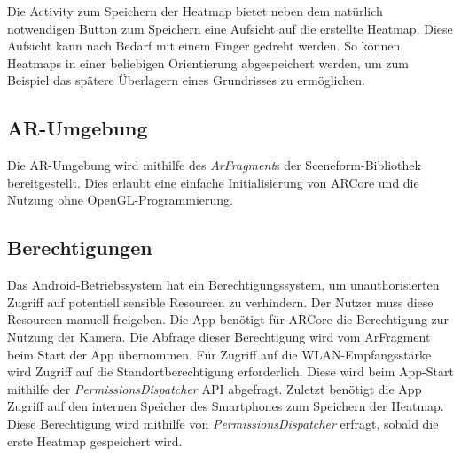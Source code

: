 \documentclass[10pt]{scrartcl}
\begin{document}
Die Activity zum Speichern der Heatmap bietet neben dem natürlich notwendigen Button zum Speichern eine Aufsicht auf die erstellte Heatmap. Diese Aufsicht kann nach Bedarf mit einem Finger gedreht werden. So können Heatmaps in einer beliebigen Orientierung abgespeichert werden, um zum Beispiel das spätere Überlagern eines Grundrisses zu ermöglichen.

\subsection{AR-Umgebung}
Die AR-Umgebung wird mithilfe des \textit{ArFragment}s der Sceneform-Bibliothek bereitgestellt. Dies erlaubt eine einfache Initialisierung von ARCore und die Nutzung ohne OpenGL-Programmierung.

\subsection{Berechtigungen}
Das Android-Betriebssystem hat ein Berechtigungssystem, um unauthorisierten Zugriff auf potentiell sensible Resourcen zu verhindern. Der Nutzer muss diese Resourcen manuell freigeben. Die App benötigt für ARCore die Berechtigung zur Nutzung der Kamera. Die Abfrage dieser Berechtigung wird vom ArFragment beim Start der App übernommen. Für Zugriff auf die WLAN-Empfangsstärke wird Zugriff auf die Standortberechtigung erforderlich. Diese wird beim App-Start mithilfe der \textit{PermissionsDispatcher} API \cite{pdisp} abgefragt. Zuletzt benötigt die App Zugriff auf den internen Speicher des Smartphones zum Speichern der Heatmap. Diese Berechtigung wird mithilfe von \textit{PermissionsDispatcher} erfragt, sobald die erste Heatmap gespeichert wird.
\end{document}
